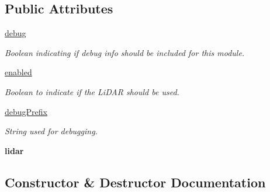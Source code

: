 \subsection*{Public Attributes}
\begin{DoxyCompactItemize}
\item 
\mbox{\label{classmcs_1_1firmware_1_1rpLiDAR__A2M4__R4_1_1rpLiDAR__A2M4__R4_a46b5884ffedd9c25020ef9d76ed68dda}} 
\hyperlink{classmcs_1_1firmware_1_1rpLiDAR__A2M4__R4_1_1rpLiDAR__A2M4__R4_a46b5884ffedd9c25020ef9d76ed68dda}{debug}
\begin{DoxyCompactList}\small\item\em Boolean indicating if debug info should be included for this module. \end{DoxyCompactList}\item 
\hyperlink{classmcs_1_1firmware_1_1rpLiDAR__A2M4__R4_1_1rpLiDAR__A2M4__R4_a7fadda01c63eaf93682605c352b17702}{enabled}
\begin{DoxyCompactList}\small\item\em Boolean to indicate if the Li\+D\+AR should be used. \end{DoxyCompactList}\item 
\mbox{\label{classmcs_1_1firmware_1_1rpLiDAR__A2M4__R4_1_1rpLiDAR__A2M4__R4_a8108c290397c912c43cd9c11fd8b273f}} 
\hyperlink{classmcs_1_1firmware_1_1rpLiDAR__A2M4__R4_1_1rpLiDAR__A2M4__R4_a8108c290397c912c43cd9c11fd8b273f}{debug\+Prefix}
\begin{DoxyCompactList}\small\item\em String used for debugging. \end{DoxyCompactList}\item 
\mbox{\label{classmcs_1_1firmware_1_1rpLiDAR__A2M4__R4_1_1rpLiDAR__A2M4__R4_a62adc9a5b6022bd720c18d83bda5815a}} 
{\bfseries lidar}
\end{DoxyCompactItemize}


\subsection{Constructor \& Destructor Documentation}
\mbox{\label{classmcs_1_1firmware_1_1rpLiDAR__A2M4__R4_1_1rpLiDAR__A2M4__R4_a9dbead8425577c5451e602a4257a4ae8}} 
